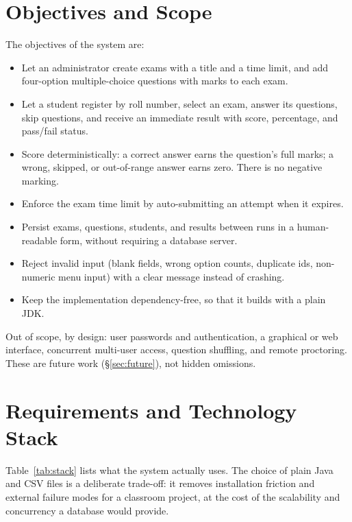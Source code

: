 \documentclass[11pt,a4paper]{article}
\begin{document}
\section{Objectives and Scope}
The objectives of the system are:
\begin{itemize}
\item Let an administrator create exams with a title and a time limit, and add
four-option multiple-choice questions with marks to each exam.
\item Let a student register by roll number, select an exam, answer its questions,
skip questions, and receive an immediate result with score, percentage, and
pass/fail status.
\item Score deterministically: a correct answer earns the question's full marks;
a wrong, skipped, or out-of-range answer earns zero. There is no negative marking.
\item Enforce the exam time limit by auto-submitting an attempt when it expires.
\item Persist exams, questions, students, and results between runs in a human-readable
form, without requiring a database server.
\item Reject invalid input (blank fields, wrong option counts, duplicate ids,
non-numeric menu input) with a clear message instead of crashing.
\item Keep the implementation dependency-free, so that it builds with a plain JDK.
\end{itemize}
Out of scope, by design: user passwords and authentication, a graphical or web
interface, concurrent multi-user access, question shuffling, and remote proctoring.
These are future work (\S\ref{sec:future}), not hidden omissions.

\section{Requirements and Technology Stack}
Table~\ref{tab:stack} lists what the system actually uses. The choice of plain Java
and CSV files is a deliberate trade-off: it removes installation friction and
external failure modes for a classroom project, at the cost of the scalability and
concurrency a database would provide.
\end{document}
